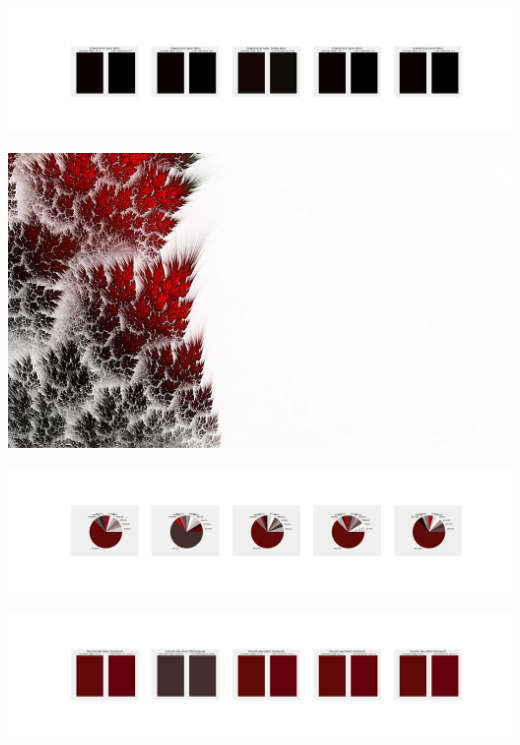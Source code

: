 \documentclass[11pt]{article}
\begin{document}
\begin{landscape}
    \begin{center}
    \includegraphics[width=250mm]{./nbimg/peak-414.jpg}
    \end{center}
    

    \begin{center}
    \includegraphics[width=\textwidth]{./nbimg/file (67).jpg}
    \end{center}

    \begin{center}
    \includegraphics[width=250mm]{./nbimg/pie-415.jpg}
    \end{center}

    \begin{center}
    \includegraphics[width=250mm]{./nbimg/peak-415.jpg}
    \end{center}
    


\end{landscape}
\end{document}
